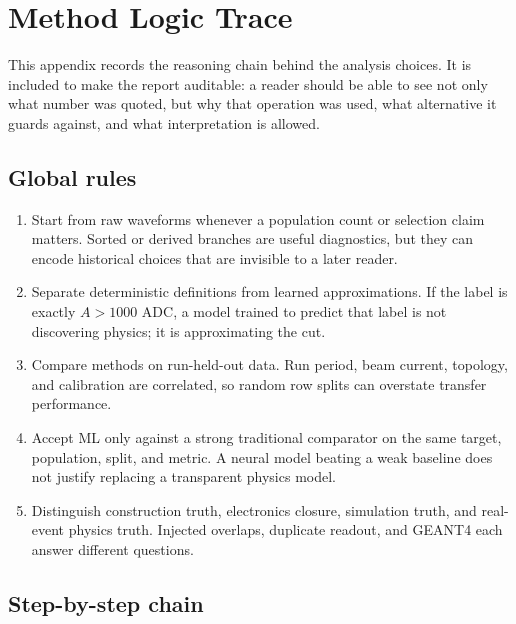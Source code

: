 \chapter{Method Logic Trace}

This appendix records the reasoning chain behind the analysis choices.  It is
included to make the report auditable: a reader should be able to see not only
what number was quoted, but why that operation was used, what alternative it
guards against, and what interpretation is allowed.

\section{Global rules}

\begin{enumerate}
  \item Start from raw waveforms whenever a population count or selection claim
  matters.  Sorted or derived branches are useful diagnostics, but they can
  encode historical choices that are invisible to a later reader.
  \item Separate deterministic definitions from learned approximations.  If the
  label is exactly \(A>1000\) ADC, a model trained to predict that label is not
  discovering physics; it is approximating the cut.
  \item Compare methods on run-held-out data.  Run period, beam current,
  topology, and calibration are correlated, so random row splits can overstate
  transfer performance.
  \item Accept ML only against a strong traditional comparator on the same
  target, population, split, and metric.  A neural model beating a weak baseline
  does not justify replacing a transparent physics model.
  \item Distinguish construction truth, electronics closure, simulation truth,
  and real-event physics truth.  Injected overlaps, duplicate readout, and
  GEANT4 each answer different questions.
\end{enumerate}

\section{Step-by-step chain}


